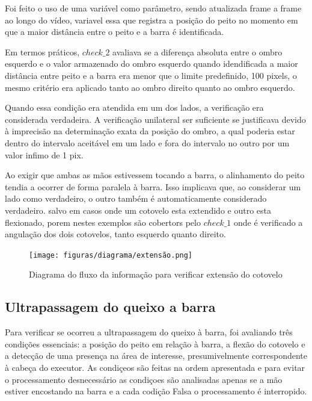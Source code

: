 Foi feito o uso de uma variável como parâmetro, sendo atualizada frame a frame ao longo do vídeo, variavel essa que registra a posição do peito no momento em que a maior distância entre o peito e a barra é identificada.

Em termos práticos, $check\_2$ avaliava se a diferença absoluta entre o ombro esquerdo e o valor armazenado do ombro esquerdo quando idendificada a maior distância entre peito e a barra era menor que o limite predefinido, 100 pixels, o mesmo critério era aplicado tanto ao ombro direito quanto ao ombro esquerdo. 

Quando essa condição era atendida em um dos lados, a verificação era considerada verdadeira. A verificação unilateral ser suficiente se justificava devido à imprecisão na determinação exata da posição do ombro, a qual poderia estar dentro do intervalo aceitável em um lado e fora do intervalo no outro por um valor infimo de 1 pix.

Ao exigir que ambas as mãos estivessem tocando a barra, o alinhamento do peito tendia a ocorrer de forma paralela à barra. Isso implicava que, ao considerar um lado como verdadeiro, o outro também é automaticamente considerado verdadeiro. salvo em casos onde um cotovelo esta extendido e outro esta flexionado, porem  nestes exemplos são cobertors pelo $check\_1$ onde é verificado a angulação dos dois cotovelos, tanto esquerdo quanto direito.


\begin{figure}[!htb]
	\centering
	\texttt{[image: figuras/diagrama/extensão.png]}
	\caption{Diagrama do fluxo da informação para verificar extensão do cotovelo}
	\label{dia:extensao}
\end{figure}





\subsection[Ultrapassagem do queixo a barra]{Ultrapassagem do queixo a barra}\label{sec:meta}

Para verificar se ocorreu a ultrapassagem do queixo à barra, foi avaliando três condições essenciais: a posição do peito em relação à barra, a flexão do cotovelo e a detecção de uma presença na área de interesse, presumivelmente correspondente à cabeça do executor. As condiçeos são feitas na ordem apresentada e para evitar o processamento desnecessário as condiçoes são analisadas apenas se a mão estiver encostando na barra e a cada codição Falsa o processamento é interropido.


